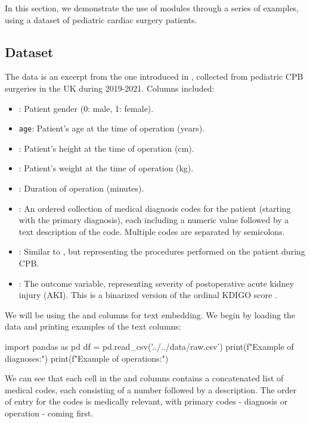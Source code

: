 \documentclass[article]{jss}
\begin{document}
In this section, we demonstrate the use of  modules through a series of examples, using a dataset of pediatric cardiac surgery patients.

\subsection{Dataset}\label{subsec:using-dataset}

The data is an excerpt from the one introduced in \cite{sharabiani2024genai}, collected from pediatric CPB surgeries in the UK during 2019-2021. Columns included:
\begin{itemize}
  \item {}: Patient gender (0: male, 1: female).
  \item \texttt{age}: Patient's age at the time of operation (years).
  \item {}: Patient's height at the time of operation (cm).
  \item {}: Patient's weight at the time of operation (kg).
  \item {}: Duration of operation (minutes).
  \item {}: An ordered collection of medical diagnosis codes for the patient (starting with the primary diagnosis), each including a numeric value followed by a text description of the code. Multiple codes are separated by semicolons.
  \item {}: Similar to , but representing the procedures performed on the patient during CPB.
  \item {}: The outcome variable, representing severity of postoperative acute kidney injury (AKI). This is a binarized version of the ordinal KDIGO score \citep{eknoyan2013kdigo}.
\end{itemize}
We will be using the  and  columns for text embedding. We begin by loading the data and printing examples of the text columns:
\begin{pyblock}
import pandas as pd
df = pd.read_csv('../../data/raw.csv')
print(f"Example of diagnoses:\n\n")
print(f"Example of operations:\n")
\end{pyblock}
\stdoutpythontex %

We can see that each cell in the  and  columns contains a concatenated list of medical codes, each consisting of a number followed by a description. The order of entry for the codes is medically relevant, with primary codes - diagnosis or operation - coming first. %
\end{document}
